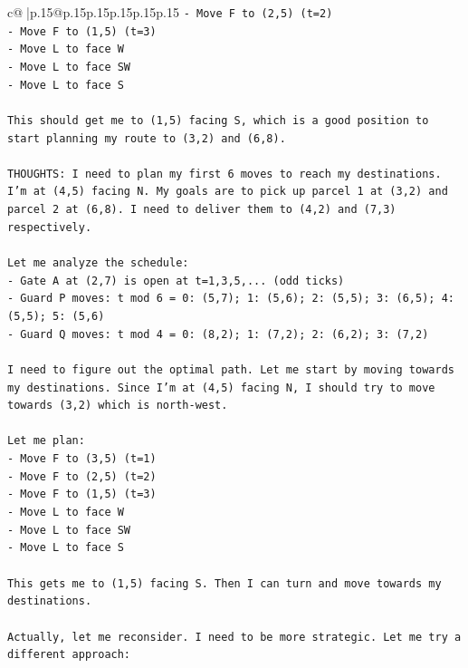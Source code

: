 \documentclass{article}
\begin{document}
{\begin{supertabular}{c@{$\;$}|p{.15\linewidth}@{}p{.15\linewidth}p{.15\linewidth}p{.15\linewidth}p{.15\linewidth}p{.15\linewidth}}
{{{\texttt{{-} Move F to (2,5) (t=2)} \\
\texttt{{-} Move F to (1,5) (t=3)} \\
\texttt{{-} Move L to face W} \\
\texttt{{-} Move L to face SW} \\
\texttt{{-} Move L to face S} \\
\\ 
\texttt{This should get me to (1,5) facing S, which is a good position to start planning my route to (3,2) and (6,8).} \\
\\ 
\texttt{THOUGHTS: I need to plan my first 6 moves to reach my destinations. I'm at (4,5) facing N. My goals are to pick up parcel 1 at (3,2) and parcel 2 at (6,8). I need to deliver them to (4,2) and (7,3) respectively.} \\
\\ 
\texttt{Let me analyze the schedule:} \\
\texttt{{-} Gate A at (2,7) is open at t=1,3,5,... (odd ticks)} \\
\texttt{{-} Guard P moves: t mod 6 = 0: (5,7); 1: (5,6); 2: (5,5); 3: (6,5); 4: (5,5); 5: (5,6)} \\
\texttt{{-} Guard Q moves: t mod 4 = 0: (8,2); 1: (7,2); 2: (6,2); 3: (7,2)} \\
\\ 
\texttt{I need to figure out the optimal path. Let me start by moving towards my destinations. Since I'm at (4,5) facing N, I should try to move towards (3,2) which is north{-}west.} \\
\\ 
\texttt{Let me plan:} \\
\texttt{{-} Move F to (3,5) (t=1)} \\
\texttt{{-} Move F to (2,5) (t=2)} \\
\texttt{{-} Move F to (1,5) (t=3)} \\
\texttt{{-} Move L to face W} \\
\texttt{{-} Move L to face SW} \\
\texttt{{-} Move L to face S} \\
\\ 
\texttt{This gets me to (1,5) facing S. Then I can turn and move towards my destinations.} \\
\\ 
\texttt{Actually, let me reconsider. I need to be more strategic. Let me try a different approach:} \\
\\ 
}}}
\end{supertabular}}
\end{document}
